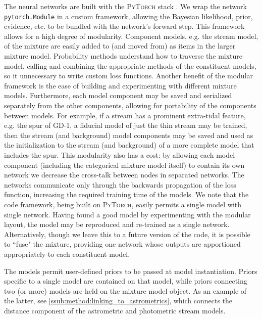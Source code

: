 \documentclass[twocolumn]{aastex631}
\newcommand{\code}[1]{\textsc{#1}}
\newcommand{\package}[1]{\code{#1}}
\newcommand{\stream}[1]{#1}
\begin{document}
        The neural networks are built with the \package{PyTorch} stack
        \citep{Pytorch2019}. We wrap the network \texttt{pytorch.Module} in a
        custom framework, allowing the Bayesian likelihood, prior, evidence,
        etc. to be bundled with the network's forward step. This framework
        allows for a high degree of modularity. Component models, e.g. the
        stream model, of the mixture are easily added to (and moved from) as
        items in the larger mixture model. Probability methods understand how to
        traverse the mixture model, calling and combining the appropriate
        methods of the constituent models, so it unnecessary to write custom
        loss functions.  Another benefit of the modular framework is the ease of
        building and experimenting with different mixture models. Furthermore,
        each model component may be saved and serialized separately from the
        other components, allowing for portability of the components between
        models.  For example, if a stream has a prominent extra-tidal feature,
        e.g. the spur of \stream{GD-1}, a fiducial model of just the thin stream
        may be trained, then the stream (and background) model components may be
        saved and used as the initialization to the stream (and background) of a
        more complete model that includes the spur. This modularity also has a
        cost: by allowing each model component (including the categorical
        mixture model itself) to contain its own network we decrease the
        cross-talk between nodes in separated networks. The networks communicate
        only through the backwards propagation of the loss function, increasing
        the required training time of the models. We note that the code
        framework, being built on \package{PyTorch}, easily permits a single
        model with single network. Having found a good model by experimenting
        with the modular layout, the model may be reproduced and re-trained as a
        single network. Alternatively, though we leave this to a future version
        of the code, it is possible to ``fuse" the mixture, providing one
        network whose outputs are apportioned appropriately to each constituent
        model.

        The models permit user-defined priors to be passed at model
        instantiation.  Priors specific to a single model are contained on that
        model, while priors connecting two (or more) models are held on the
        mixture model object. As an example of the latter, see
        \autoref{ssub:method:linking_to_astrometrics}, which connects the
        distance component of the astrometric and photometric stream models.
\end{document}
